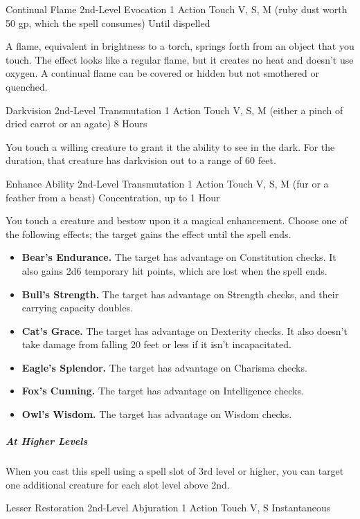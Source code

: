 {\DndSpellHeader
  {Continual Flame}
  {2nd-Level Evocation}
  {1 Action}
  {Touch}
  {V, S, M (ruby dust worth 50 gp, which the spell consumes)}
  {Until dispelled}

A flame, equivalent in brightness to a torch, springs forth from an object that you touch. The effect looks like a regular flame, but it creates no heat and doesn’t use oxygen. A continual flame can be covered or hidden but not smothered or quenched.

\DndSpellHeader
  {Darkvision}
  {2nd-Level Transmutation}
  {1 Action}
  {Touch}
  {V, S, M (either a pinch of dried carrot or an agate)}
  {8 Hours}

You touch a willing creature to grant it the ability to see in the dark. For the duration, that creature has darkvision out to a range of 60 feet.

\DndSpellHeader
  {Enhance Ability}
  {2nd-Level Transmutation}
  {1 Action}
  {Touch}
  {V, S, M (fur or a feather from a beast)}
  {Concentration, up to 1 Hour}

You touch a creature and bestow upon it a magical enhancement. Choose one of the following effects; the target gains the effect until the spell ends.
\begin{itemize}
	\item \textbf{Bear’s Endurance.} The target has advantage on Constitution checks. It also gains 2d6 temporary hit points, which are lost when the spell ends.
	\item \textbf{Bull’s Strength.} The target has advantage on Strength checks, and their carrying capacity doubles.
	\item \textbf{Cat’s Grace.} The target has advantage on Dexterity checks. It also doesn’t take damage from falling 20 feet or less if it isn’t incapacitated.
	\item \textbf{Eagle’s Splendor.} The target has advantage on Charisma checks.
	\item \textbf{Fox’s Cunning.} The target has advantage on Intelligence checks.
	\item \textbf{Owl’s Wisdom.} The target has advantage on Wisdom checks.
\end{itemize}

\subparagraph*{At Higher Levels} When you cast this spell using a spell slot of 3rd level or higher, you can target one additional creature for each slot level above 2nd.

\DndSpellHeader
  {Lesser Restoration}
  {2nd-Level Abjuration}
  {1 Action}
  {Touch}
  {V, S}
  {Instantaneous}

}
